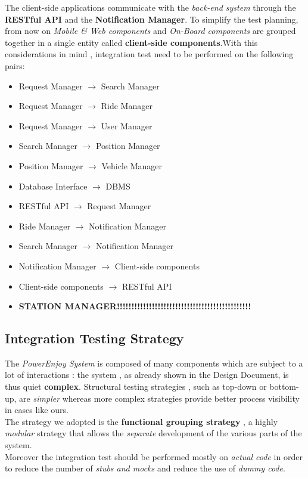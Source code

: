 The client-side applications communicate with the \emph{back-end system} through the \textbf{RESTful API} and the \textbf{Notification Manager}. To simplify the test planning, from now on \emph{Mobile \& Web components} and \emph{On-Board components} are grouped together in a single entity called \textbf{client-side components}.With this considerations in mind , integration test need to be performed on the following pairs:
\begin{itemize}
\item Request Manager $\rightarrow$ Search Manager
\item Request Manager $\rightarrow$ Ride Manager
\item Request Manager $\rightarrow$ User Manager
\item Search Manager $\rightarrow$ Position Manager
\item Position Manager $\rightarrow$ Vehicle Manager
\item Database Interface $\rightarrow$ DBMS
\item RESTful API $\rightarrow$ Request Manager
\item Ride Manager $\rightarrow$ Notification Manager
\item Search Manager $\rightarrow$ Notification Manager
\item Notification Manager $\rightarrow$ Client-side components
\item Client-side components $\rightarrow$ RESTful API
\item \textbf{STATION MANAGER!!!!!!!!!!!!!!!!!!!!!!!!!!!!!!!!!!!!!!!!!!!!!!}
\end{itemize}

\subsection{Integration Testing Strategy}
The \emph{PowerEnjoy System} is composed of many components which are subject to a lot of interactions : the system , as already shown in the Design Document, is thus quiet \textbf{complex}. Structural testing strategies , such as top-down or bottom-up, are \emph{simpler} whereas more complex strategies provide better process visibility in cases like ours.\\
The strategy we adopted is the \textbf{functional grouping strategy} , a highly \emph{modular} strategy that allows the \emph{separate} development of the various parts of the system.\\
Moreover the integration test should be performed mostly on \emph{actual code} in order to reduce the number of \emph{stubs and mocks} and reduce the use of \emph{dummy code}.


